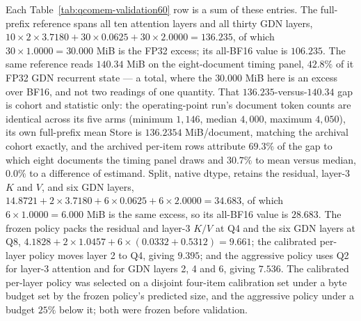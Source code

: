 \documentclass{article}
\begin{document}
Each Table~\ref{tab:qcomem-validation60} row is a sum of these entries.  The
full-prefix reference spans all ten attention layers and all thirty GDN layers,
$10\times2\times3.7180+30\times0.0625+30\times2.0000=136.235$, of which
$30\times1.0000=30.000$ MiB is the FP32 excess; its all-BF16 value is
$106.235$.  The same reference reads $140.34$ MiB on the eight-document timing
panel, $42.8\%$ of it FP32 GDN recurrent state --- a total, where the $30.000$
MiB here is an excess over BF16, and not two readings of one quantity.  That
$136.235$-versus-$140.34$ gap is cohort and statistic only: the operating-point
run's document token counts are identical across its five arms (minimum
$1{,}146$, median $4{,}000$, maximum $4{,}050$), its own full-prefix mean Store
is $136.2354$ MiB/document, matching the archival cohort exactly, and the
archived per-item rows attribute $69.3\%$ of the gap to which eight documents the
timing panel draws and $30.7\%$ to mean versus median, $0.0\%$ to a difference of
estimand.  Split, native dtype, retains the residual, layer-3 $K$ and $V$, and six GDN
layers, $14.8721+2\times3.7180+6\times0.0625+6\times2.0000=34.683$, of which
$6\times1.0000=6.000$ MiB is the same excess, so its all-BF16 value is
$28.683$.  The frozen policy packs the residual and layer-3 $K/V$ at Q4 and the
six GDN layers at Q8, $4.1828+2\times1.0457+6\times(0.0332+0.5312)=9.661$; the
calibrated per-layer policy moves layer 2 to Q4, giving $9.395$; and the aggressive
policy uses Q2 for layer-3 attention and for GDN layers 2, 4 and 6, giving
$7.536$.  The calibrated per-layer policy was selected on a disjoint four-item
calibration set under a byte budget set by the frozen policy's predicted size,
and the aggressive policy under a budget $25\%$ below it; both were frozen
before validation.
\end{document}
